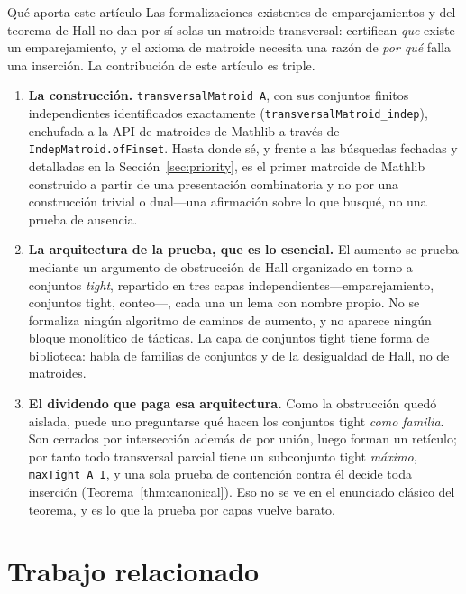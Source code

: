 \documentclass[11pt]{article}
\newcommand{\lean}[1]{\texttt{#1}}
\begin{document}
\begin{contribbox}{Qué aporta este artículo}
Las formalizaciones existentes de emparejamientos y del teorema de Hall no dan por sí solas un
matroide transversal: certifican \emph{que} existe un emparejamiento, y el axioma de matroide
necesita una razón de \emph{por qué} falla una inserción. La contribución de este artículo es
triple.
\begin{enumerate}\itemsep2pt
\item \textbf{La construcción.} \lean{transversalMatroid A}, con sus conjuntos finitos
independientes identificados exactamente (\lean{transversalMatroid\_indep}), enchufada a la API de
matroides de Mathlib a través de \lean{IndepMatroid.ofFinset}. Hasta donde sé, y frente a las
búsquedas fechadas y detalladas en la Sección~\ref{sec:priority}, es el primer matroide de Mathlib
construido a partir de una presentación combinatoria y no por una construcción trivial o
dual---una afirmación sobre lo que busqué, no una prueba de ausencia.
\item \textbf{La arquitectura de la prueba, que es lo esencial.} El aumento se prueba mediante un
argumento de obstrucción de Hall organizado en torno a conjuntos \emph{tight}, repartido en tres
capas independientes---emparejamiento, conjuntos tight, conteo---, cada una un lema con nombre
propio. No se formaliza ningún algoritmo de caminos de aumento, y no aparece ningún bloque
monolítico de tácticas. La capa de conjuntos tight tiene forma de biblioteca: habla de familias de
conjuntos y de la desigualdad de Hall, no de matroides.
\item \textbf{El dividendo que paga esa arquitectura.} Como la obstrucción quedó aislada, puede uno
preguntarse qué hacen los conjuntos tight \emph{como familia}. Son cerrados por intersección además
de por unión, luego forman un retículo; por tanto todo transversal parcial tiene un subconjunto
tight \emph{máximo}, \lean{maxTight A I}, y una sola prueba de contención contra él decide toda
inserción (Teorema~\ref{thm:canonical}). Eso no se ve en el enunciado clásico del teorema, y es lo
que la prueba por capas vuelve barato.
\end{enumerate}
\end{contribbox}

\section{Trabajo relacionado}\label{sec:related}
\end{document}
